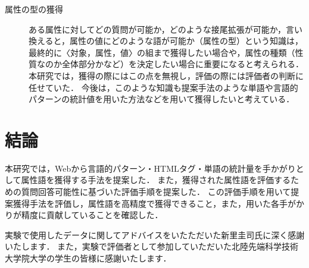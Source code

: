 \begin{description}
\item[属性の型の獲得] 
ある属性に対してどの質問が可能か，どのような接尾拡張が可能か，言い換えると，属性の値にどのような語が可能か（属性の型）という知識は，最終的に〈対象，属性，値〉の組まで獲得したい場合や，属性の種類（性質なのか全体部分かなど）を決定したい場合に重要になると考えられる．
本研究では，獲得の際にはこの点を無視し，評価の際には評価者の判断に任せていた．
今後は，このような知識も提案手法のような単語や言語的パターンの統計値を用いた方法などを用いて獲得したいと考えている．
\end{description}


\section{結論}
\label{sec:conclusion}
本研究では，Webから言語的パターン・HTMLタグ・単語の統計量を手かがりとして属性語を獲得する手法を提案した．
また，獲得された属性語を評価するための質問回答可能性に基づいた評価手順を提案した．
この評価手順を用いて提案獲得手法を評価し，属性語を高精度で獲得できること，また，用いた各手がかりが精度に貢献していることを確認した．

\acknowledgment

実験で使用したデータに関してアドバイスをいたただいた新里圭司氏に深く感謝いたします．
また，実験で評価者として参加していただいた北陸先端科学技術大学院大学の学生の皆様に感謝いたします．

\clearpage

